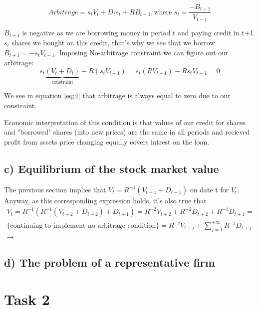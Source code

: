 \documentclass{article}
\begin{document}
\begin{equation*}
\textit{Arbitrage} = s_t V_t + D_t s_t + RB_{t+1}, \text{where }s_t = \frac{-B_{t+1}}{V_{t-1}}
\end{equation*}

$B_{t+1}$ is negative as we are borrowing money in period t and paying credit in t+1. $s_t$ shares we bought on this credit, that's why we see that we borrow $B_{t+1} = -s_t V_{t-1}$.
Imposing No-arbitrage constraint we can figure out our arbitrage:
\begin{equation} \label{eq:4}
	s_t\underbrace{(V_t + D_t)}_\text{constraint} - R(s_t V_{t-1}) = s_t (RV_{t-1}) - Rs_t V_{t-1} = 0
\end{equation}

We see in  equation \ref{eq:4} that arbitrage is always equal to zero due to our constraint.

Economic interpretation of this condition is that values of our credit for shares and "borrowed" shares (into new prices) are the same in all periods and recieved profit from assets price changing equally covers intrest on the loan.
\subsection*{c) Equilibrium of the stock market value}
The previous section implies that $ V_t = R^{-1}(V_{t+1} + D_{t+1}) $ on date t for $ V_t $. Anyway, as this corresponding expression holds, it's also true that
\begin{multline*}
	V_t = R^{-1}(R^{-1}(V_{t+2} + D_{t+2}) + D_{t+1}) = R^{-2}V_{t+2} + R^{-2}D_{t+2} + R^{-1}D_{t+1} = \\
	\text{\{continuing to implement no-arbitrage condition\}} = R^{-j}V_{t+j} + \sum_{j=1}^{+\infty}R^{-j}D_{t+j} \\
	\rightarrow
\end{multline*}

\subsection*{d) The problem of a representative firm}


\section*{Task 2} \label{sec:sec2}
\end{document}
